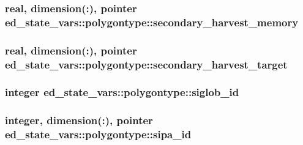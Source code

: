 \subsubsection[{\texorpdfstring{secondary\+\_\+harvest\+\_\+memory}{secondary_harvest_memory}}]{\setlength{\rightskip}{0pt plus 5cm}real, dimension(\+:), pointer ed\+\_\+state\+\_\+vars\+::polygontype\+::secondary\+\_\+harvest\+\_\+memory}\hypertarget{structed__state__vars_1_1polygontype_ab5a9a1a94b8a6ceb0c242cddb0d6b29c}{}\label{structed__state__vars_1_1polygontype_ab5a9a1a94b8a6ceb0c242cddb0d6b29c}
\subsubsection[{\texorpdfstring{secondary\+\_\+harvest\+\_\+target}{secondary_harvest_target}}]{\setlength{\rightskip}{0pt plus 5cm}real, dimension(\+:), pointer ed\+\_\+state\+\_\+vars\+::polygontype\+::secondary\+\_\+harvest\+\_\+target}\hypertarget{structed__state__vars_1_1polygontype_ad9dcbfad7f9f46a2aed8f73409790995}{}\label{structed__state__vars_1_1polygontype_ad9dcbfad7f9f46a2aed8f73409790995}
\subsubsection[{\texorpdfstring{siglob\+\_\+id}{siglob_id}}]{\setlength{\rightskip}{0pt plus 5cm}integer ed\+\_\+state\+\_\+vars\+::polygontype\+::siglob\+\_\+id}\hypertarget{structed__state__vars_1_1polygontype_a2637538336203cb4eda18c31331df88d}{}\label{structed__state__vars_1_1polygontype_a2637538336203cb4eda18c31331df88d}
\subsubsection[{\texorpdfstring{sipa\+\_\+id}{sipa_id}}]{\setlength{\rightskip}{0pt plus 5cm}integer, dimension(\+:), pointer ed\+\_\+state\+\_\+vars\+::polygontype\+::sipa\+\_\+id}\hypertarget{structed__state__vars_1_1polygontype_a12e4757484e2fb2884b823ce0302bf8f}{}\label{structed__state__vars_1_1polygontype_a12e4757484e2fb2884b823ce0302bf8f}
